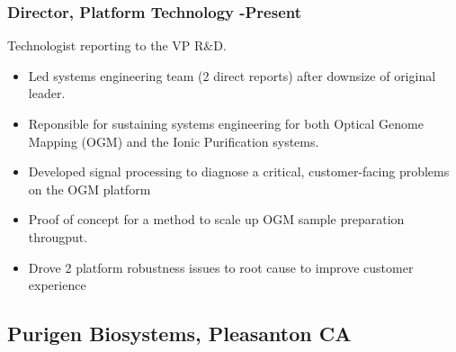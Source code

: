 \documentclass{res}
\begin{document}
\begin{resume}
   \subsubsection{Director, Platform Technology -Present}
   \vspace{-0.1in}
   Technologist reporting to the VP R\&D. 
    \vspace{0.1in}
    \begin{itemize}
     \item Led systems engineering team (2 direct reports) after downsize of original leader. 
     \item Reponsible for sustaining systems engineering for both Optical Genome Mapping (OGM) and the Ionic Purification systems. 
     \item Developed signal processing to diagnose a critical, customer-facing problems on the OGM platform
     \item Proof of concept for a method to scale up OGM sample preparation througput.  
     \item Drove 2 platform robustness issues to root cause to improve customer experience
    \end{itemize}


   \subsection{Purigen Biosystems, Pleasanton CA}
    \vspace{-0.1in}


\end{resume}
\end{document}
